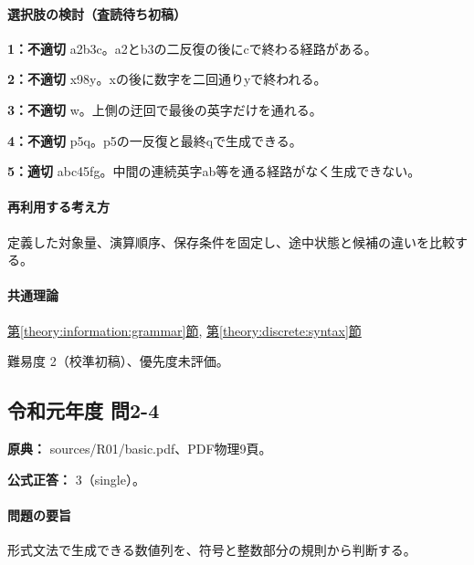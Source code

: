 \paragraph{選択肢の検討（査読待ち初稿）}\mbox{}\par

\noindent\textbf{1：不適切} a2b3c。a2とb3の二反復の後にcで終わる経路がある。\par

\noindent\textbf{2：不適切} x98y。xの後に数字を二回通りyで終われる。\par

\noindent\textbf{3：不適切} w。上側の迂回で最後の英字だけを通れる。\par

\noindent\textbf{4：不適切} p5q。p5の一反復と最終qで生成できる。\par

\noindent\textbf{5：適切} abc45fg。中間の連続英字ab等を通る経路がなく生成できない。\par

\paragraph{再利用する考え方} 定義した対象量、演算順序、保存条件を固定し、途中状態と候補の違いを比較する。

\paragraph{共通理論} \hyperref[theory:information:grammar]{第\ref*{theory:information:grammar}節}, \hyperref[theory:discrete:syntax]{第\ref*{theory:discrete:syntax}節}

\par 難易度 2（校準初稿）、優先度未評価。

\subsection{令和元年度 問2-4}
\label{q:r01-reg-basic-2-4}

\noindent\textbf{原典：} sources/R01/basic.pdf、PDF物理9頁。

\textbf{公式正答：} 3（single）。

\paragraph{問題の要旨} 形式文法で生成できる数値列を、符号と整数部分の規則から判断する。

